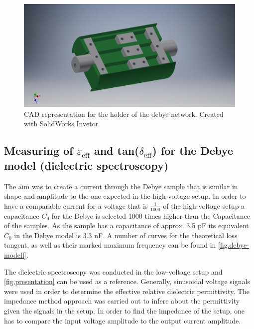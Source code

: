 \begin{figure}[h!tb]
\includegraphics[width=\textwidth]{figures/Method/CAD_MODEL/Gesamtanordnung.jpg}
\caption{CAD representation for the holder of the debye network. Created with SolidWorks Invetor}
\label{fig.CADgraph}
\end{figure}




    

\subsection{Measuring of $\varepsilon_{\textrm{eff}}$ and tan($\delta_{\textrm{eff}}$) for the Debye model (dielectric spectroscopy)}
\label{spectroscopy}
The aim was to create a current through the Debye sample that is similar in shape and amplitude to the one expected in the high-voltage setup. In order to have a comparable current for a voltage that is $\frac{1}{1000}$ of the high-voltage setup a capacitance $C_0$ for the Debye is selected 1000 times higher than the Capacitance of the samples. As the sample has a capacitance of approx. 3.5 pF its equivalent $C_0$ in the Debye model is 3.3 nF.
A number of curves for the theoretical loss tangent, as well as their marked maximum frequency can be found in \ref{fig.debye-modell}.

The dielectric spectroscopy was conducted in the low-voltage setup and \ref{fig.presentation} can be used as a reference.
Generally, sinusoidal voltage signals were used in order to determine the effective relative dielectric permittivity.
The impedance method \cite{Kramer} approach was carried out to infere about the permittivity given the signals in the setup.
In order to find the impedance of the setup, one has to compare the input voltage amplitude to the output current amplitude.

